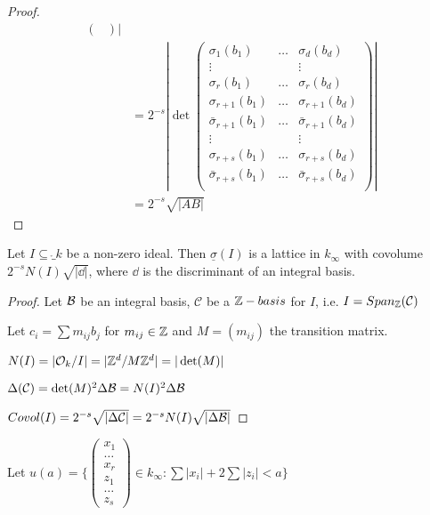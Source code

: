 \documentclass[11pt]{article}
\begin{document}
\begin{proof}
\begin{align*}
\begin{pmatrix}
		\end{pmatrix} |\\
	& = 2^{-s} |\det
 \begin{pmatrix}
			\sigma_1(b_1) & \dots & \sigma_d(b_d)\\
			\vdots && \vdots\\
			\sigma_r(b_1) &\dots & \sigma_r(b_d)\\
			\sigma_{r+1}(b_1) &\dots& \sigma_{r+1}(b_d)\\
			\bar\sigma_{r+1}(b_1) &\dots& \bar\sigma_{r+1}(b_d)\\
			\vdots && \vdots \\
			\sigma_{r+s}(b_1) &\dots& \sigma_{r+s}(b_d)\\
			\bar\sigma_{r+s}(b_1) &\dots& \bar\sigma_{r+s}(b_d)\\
		\end{pmatrix} |\\
		& = 2^{-s} \sqrt{|AB|}
\end{align*}
\end{proof}

\begin{lemma}
Let $I \subseteq \ring_k$ be a non-zero ideal. 
	Then $\underline\sigma(I)$ is a lattice in $k_\infty $ with covolume $2^{-s} N(I) \sqrt{|\dd|}$, where $\dd$ is the discriminant of an integral basis.
\end{lemma}



\begin{proof}
	Let $\mathcal{B}$ be an integral basis, $\mathcal{C}$ be a $\mathbb{Z}-basis$ for $I$, i.e. $I = Span_{\mathbb{Z}}(\mathcal{C})$

	Let $c_i = \sum m_{ij} b_j$ for $m_{ij} \in \mathbb{Z}$ and $M = (m_{ij})$ the transition matrix.
	\spa

	$N(I) = |\mathcal{O}_k/I | = | \mathbb{Z}^d /M\mathbb{Z}^d| = |\det (M)|$
	\spa

	$\Delta(\mathcal{C}) = \det(M)^2 \Delta \mathcal{B} = N(I)^2 \Delta \mathcal{B}$
	\spa

	$Covol(I) = 2^{-s} \sqrt{|\Delta \mathcal{C}|} = 2^{-s} N(I) \sqrt{|\Delta\mathcal{B}|}$

\end{proof}




\begin{defn}
	Let $u(a) = \{ \begin{pmatrix}
		x_1\\
		\dots\\
		x_r\\
		z_1\\
		\dots\\
		z_s
	\end{pmatrix} \in k_\infty : \sum |x_i| + 2\sum|z_i| < a\}$
\end{defn}
\end{document}
